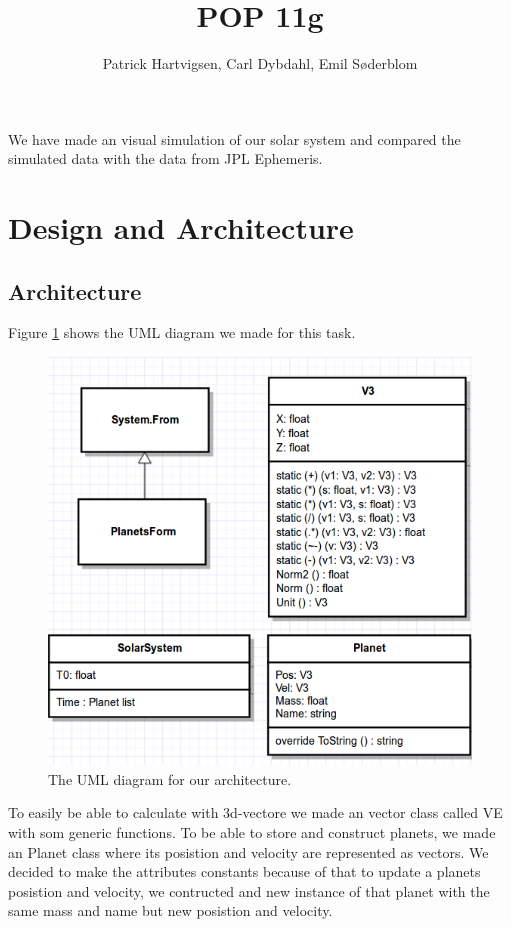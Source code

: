 \documentclass[a4paper]{article}
\title{POP 11g}
\author{Patrick Hartvigsen, Carl Dybdahl, Emil Søderblom}
\begin{document}
\maketitle

We have made an visual simulation of our solar system and compared the simulated data with the data from JPL Ephemeris.

\section{Design and Architecture}

\subsection{Architecture}

Figure \ref{uml} shows the UML diagram we made for this task. 

\begin{figure}[!ht]
\centering
\includegraphics{uml.png}
\caption{The UML diagram for our architecture.}
\label{uml}
\end{figure}

To easily be able to calculate with 3d-vectore we made an vector class called VE with som generic functions.
To be able to store and construct planets, we made an Planet class where its posistion and velocity are represented as vectors. We decided to make the attributes constants because of that to update a planets posistion and velocity, we contructed and new instance of that planet with the same mass and name but new posistion and velocity.
\end{document}
